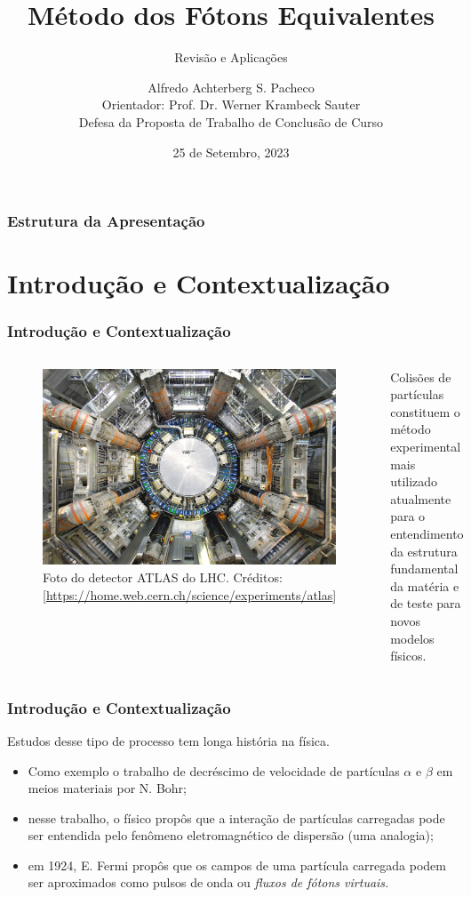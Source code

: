\documentclass[xcolor=dvipsnames]{beamer}
\title{Método dos Fótons Equivalentes}
\subtitle{Revisão e Aplicações}
\author[A. A. S. Pacheco]{
	Alfredo Achterberg S. Pacheco\\
	{\footnotesize Orientador: Prof.  Dr. Werner Krambeck Sauter}\\
	{\scriptsize Defesa da Proposta de Trabalho de Conclusão de Curso}
}
\institute[UFPel]{
	Curso de Bacharelado em Física - Universidade Federal de Pelotas
}
\date[25 de set., 2023]{25 de Setembro, 2023}
\begin{document}
\frame{\titlepage}

\begin{frame}
\frametitle{Estrutura da Apresentação}
\tableofcontents
\end{frame}

\section{Introdução e Contextualização}

\begin{frame}
	\frametitle{Introdução e Contextualização}

	\begin{columns}
		\begin{figure}
			\includegraphics[width=\columnwidth]{./figs/atlan_normal.jpg}
			\caption{Foto do detector ATLAS do LHC. {\scriptsize Créditos:
			[\url{https://home.web.cern.ch/science/experiments/atlas}]}}
		\end{figure}
	
		Colisões de partículas constituem o método experimental mais utilizado
		atualmente para o entendimento da estrutura fundamental da matéria e de
		teste para novos modelos físicos.
	\end{columns}

\end{frame}

\begin{frame}
	\frametitle{Introdução e Contextualização}
	Estudos desse tipo de processo tem longa história na física.
	\begin{itemize}
		\item Como exemplo o trabalho de decréscimo de velocidade de partículas
			$\alpha$ e $\beta$ em meios materiais por N. Bohr;
		\item nesse trabalho, o físico propôs que a interação de partículas
			carregadas pode ser entendida pelo fenômeno eletromagnético de
			dispersão (uma analogia);
		\item em 1924, E. Fermi propôs que os campos de uma partícula carregada
			podem ser aproximados como pulsos de onda ou \textit{fluxos de
			fótons virtuais.}
	\end{itemize}
\end{frame}
\end{document}
